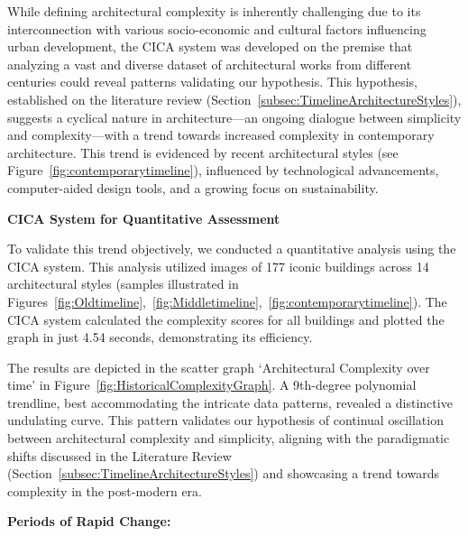 %    


While defining architectural complexity is inherently challenging due to its interconnection with various socio-economic and cultural factors influencing urban development, the CICA system was developed on the premise that analyzing a vast and diverse dataset of architectural works from different centuries could reveal patterns validating our hypothesis.
This hypothesis, established on the literature review (Section~\ref{subsec:TimelineArchitectureStyles}), suggests a cyclical nature in architecture—an ongoing dialogue between simplicity and complexity—with a trend towards increased complexity in contemporary architecture.
This trend is evidenced by recent architectural styles (see Figure~\ref{fig:contemporarytimeline}), influenced by technological advancements, computer-aided design tools, and a growing focus on sustainability.

\textbf{CICA System for Quantitative Assessment}


To validate this trend objectively, we conducted a quantitative analysis using the CICA system.
This analysis utilized images of 177 iconic buildings across 14 architectural styles (samples illustrated in Figures~\ref{fig:Oldtimeline},~\ref{fig:Middletimeline},~\ref{fig:contemporarytimeline}). The CICA system calculated the complexity scores for all buildings and plotted the graph in just 4.54 seconds, demonstrating its efficiency.

The results are depicted in the scatter graph `Architectural Complexity over time' in Figure~\ref{fig:HistoricalComplexityGraph}.
A 9th-degree polynomial trendline, best accommodating the intricate data patterns, revealed a distinctive undulating curve.
This pattern validates our hypothesis of continual oscillation between architectural complexity and simplicity, aligning with the paradigmatic shifts discussed in the Literature Review (Section~\ref{subsec:TimelineArchitectureStyles}) and showcasing a trend towards complexity in the post-modern era.

\textbf{Periods of Rapid Change:}

